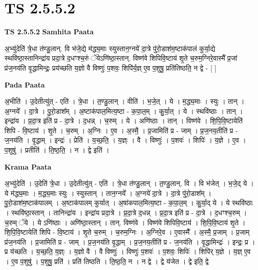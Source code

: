 \documentclass[17pt]{extarticle}
\begin{document}
\section*{ TS 2.5.5.2 }

\textbf{TS 2.5.5.2 } \newline
\textbf{Samhita Paata} \newline

अ॒भ्यु॑देति॑ त्रे॒धा त॑ण्डु॒लान्. वि भ॑जे॒द्ये म॑द्ध्य॒माः स्युस्तान॒ग्नये॑ दा॒त्रे पु॑रो॒डाश॑म॒ष्टाक॑पालं कुर्या॒द्ये स्थवि॑ष्ठा॒स्तानिन्द्रा॑य प्रदा॒त्रे द॒धꣳश्च॒रुं ॅयेऽणि॑ष्ठा॒स्तान्. विष्ण॑वे शिपिवि॒ष्टाय॑ शृ॒ते च॒रुम॒ग्निरे॒वास्मै᳚ प्र॒जां प्र॑ज॒नय॑ति वृ॒द्धामिन्द्रः॒ प्रय॑च्छति य॒ज्ञो वै विष्णुः॑ प॒शवः॒ शिपि॑र्य॒ज्ञ् ए॒व प॒शुषु॒ प्रति॑तिष्ठति॒ न द्वे - [  ] \newline

\textbf{Pada Paata} \newline

अ॒भीति॑ । उ॒देतीत्यु॑त् - एति॑ । त्रे॒धा । त॒ण्डु॒लान् । वीति॑ । भ॒जे॒त् । ये । म॒द्ध्य॒माः । स्युः । तान् । अ॒ग्नये᳚ । दा॒त्रे । पु॒रो॒डाश᳚म् । अ॒ष्टाक॑पाल॒मित्य॒ष्टा - क॒पा॒ल॒म् । कु॒र्या॒त् । ये । स्थवि॑ष्ठाः । तान् । इन्द्रा॑य । प्र॒दा॒त्र इति॑ प्र - दा॒त्रे । द॒धन्न् । च॒रुम् । ये । अणि॑ष्ठाः । तान् । विष्ण॑वे । शि॒पि॒वि॒ष्टायेति॑ शिपि - वि॒ष्टाय॑ । शृ॒ते । च॒रुम् । अ॒ग्निः । ए॒व । अ॒स्मै॒ । प्र॒जामिति॑ प्र - जाम् । प्र॒ज॒नय॒तीति॑ प्र - ज॒नय॑ति । वृ॒द्धाम् । इन्द्रः॑ । प्रेति॑ । य॒च्छ॒ति॒ । य॒ज्ञ्ः । वै । विष्णुः॑ । प॒शवः॑ । शिपिः॑ । य॒ज्ञे । ए॒व । प॒शुषु॑ । प्रतीति॑ । ति॒ष्ठ॒ति॒ । न । द्वे इति॑ ।  \newline


\textbf{Krama Paata} \newline

अ॒भ्यु॑देति॑ । उ॒देति॑ त्रे॒धा । उ॒देतीत्यु॑त् - एति॑ । त्रे॒धा त॑ण्डु॒लान् । त॒ण्डु॒लान्. वि । वि भ॑जेत् । भ॒जे॒द् ये । ये म॑द्ध्य॒माः । म॒द्ध्य॒माः स्युः । स्युस्तान् । तान॒ग्नये᳚ । अ॒ग्नये॑ दा॒त्रे । दा॒त्रे पु॑रो॒डाश᳚म् । पु॒रो॒डाश॑म॒ष्टाक॑पालम् । अ॒ष्टाक॑पालम् कुर्यात् । अ॒षा॑कपाल॒मित्य॒ष्टा - क॒पा॒ल॒म् । कु॒र्या॒द् ये । ये स्थवि॑ष्ठाः । स्थवि॑ष्ठा॒स्तान् । तानिन्द्रा॑य । इन्द्रा॑य प्रदा॒त्रे । प्र॒दा॒त्रे द॒धन्न् । प्र॒दा॒त्र इति॑ प्र - दा॒त्रे । द॒धꣳश्च॒रुम् । च॒रुम् ॅये । ये ऽणि॑ष्ठाः । अणि॑ष्ठा॒स्तान् । तान्. विष्ण॑वे । विष्ण॑वे शिपिवि॒ष्टाय॑ । शि॒पि॒वि॒ष्टाय॑ शृ॒ते । शि॒पि॒वि॒ष्टायेति॑ शिपि - वि॒ष्टाय॑ । शृ॒ते च॒रुम् । च॒रुम॒ग्निः । अ॒ग्निरे॒व । ए॒वास्मै᳚ । अ॒स्मै॒ प्र॒जाम् । प्र॒जाम् प्र॑ज॒नय॑ति । प्र॒जामिति॑ प्र - जाम् । प्र॒ज॒नय॑ति वृ॒द्धाम् । प्र॒ज॒नय॒तीति॑ प्र - ज॒नय॑ति । वृ॒द्धामिन्द्रः॑ । इन्द्रः॒ प्र । प्र य॑च्छति । य॒च्छ॒ति॒ य॒ज्ञ्ः । य॒ज्ञो वै । वै विष्णुः॑ । विष्णुः॑ प॒शवः॑ । प॒शवः॒ शिपिः॑ । शिपि॑र् य॒ज्ञे । य॒ज्ञ् ए॒व । ए॒व प॒शुषु॑ । प॒शुषु॒ प्रति॑ । प्रति॑ तिष्ठति । ति॒ष्ठ॒ति॒ न । न द्वे । द्वे य॑जेत । द्वे इति॒ द्वे \newline
\end{document}
